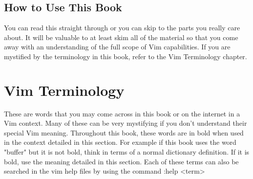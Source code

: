 \documentclass[12pt, oneside]{book}
\begin{document}
\section{How to Use This Book}
You can read this straight through or you can skip to the parts you really care about.  It will be valuable to at least skim all of the material so that you come away with an understanding of the full
scope of Vim capabilities.  If you are mystified by the terminology in this book, refer to the Vim Terminology chapter.

\chapter{Vim Terminology}
These are words that you may come across in this book or on the internet in a Vim context.  Many of these can be very mystifying if you don't understand their special Vim meaning.  Throughout this
book, these words are in bold when used in the context detailed in this section.  For example if this book uses the word "buffer" but it is not bold, think in terms of a normal dictionary definition.
If it is bold, use the meaning detailed in this section.  Each of these terms can also be searched in the vim help files by using the command :help <term>
\end{document}
